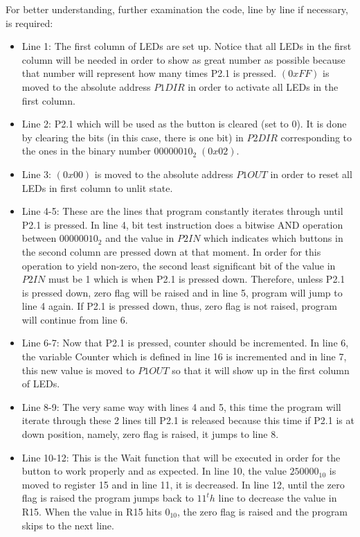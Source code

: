 \documentclass[pdftex,12pt,a4paper]{article}
\begin{document}
For better understanding, further examination the code, line by line if necessary, is required:
\begin{itemize}
    \item Line 1: The first column of LEDs are set up. Notice that all LEDs in the first column will be needed in order to show as great number as possible because that number will represent how many times P2.1 is pressed. $(0xFF)$ is moved to the absolute address $P1DIR$ in order to activate all LEDs in the first column.

\item Line 2: P2.1 which will be used as the button is cleared (set to $0$). It is done by clearing the bits (in this case, there is one bit) in $P2DIR$ corresponding to the ones in the binary number $00000010_2\;(0x02)$.

\item Line 3: $(0x00)$ is moved to the absolute address $P1OUT$ in order to reset all LEDs in first column to unlit state.

\item Line 4-5: These are the lines that program constantly iterates through until P2.1 is pressed. In line 4, bit test instruction does a bitwise AND operation between $00000010_2$ and the value in $P2IN$ which indicates which buttons in the second column are pressed down at that moment. In order for this operation to yield non-zero, the second least significant bit of the value in $P2IN$ must be 1 which is when P2.1 is pressed down. Therefore, unless P2.1 is pressed down, zero flag will be raised and in line 5, program will jump to line 4 again. If P2.1 is pressed down, thus, zero flag is not raised, program will continue from line 6.

\item Line 6-7: Now that P2.1 is pressed, counter should be incremented. In line 6, the variable Counter which is defined in line 16 is incremented and in line 7, this new value is moved to $P1OUT$ so that it will show up in the first column of LEDs.

\item Line 8-9: The very same way with lines 4 and 5, this time the program will iterate through these 2 lines till P2.1 is released because this time if P2.1 is at down position, namely, zero flag is raised, it jumps to line 8.

\item Line 10-12: This is the Wait function that will be executed in order for the button to work properly and as expected. In line 10, the value $250000_{10}$ is moved to register 15 and in line 11, it is decreased. In line 12, until the zero flag is raised the program jumps back to $11^th$ line to decrease the value in R15. When the value in R15 hits $0_{10}$, the zero flag is raised and the program skips to the next line.


\end{itemize}
\end{document}
